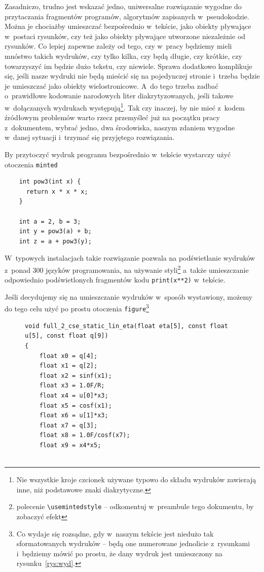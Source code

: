 {Zasadniczo, trudno jest wskazać jedno, uniwersalne rozwiązanie wygodne do przytaczania fragmentów programów, algorytmów zapisanych w~pseudokodzie. Mo\-żna je chociażby umieszczać bezpośrednio w~tekście, jako obiekty pływające w~postaci rysunków, czy też jako obiekty pływające utworzone niezależnie od rysunków. Co lepiej zapewne zależy od tego, czy w~pracy będziemy mieli mnóstwo takich wydruków, czy tylko kilka, czy będą długie, czy krótkie, czy towarzyszyć im będzie dużo tekstu, czy niewiele. Sprawa dodatkowo komplikuje się, jeśli nasze wydruki nie będą mieścić się na pojedynczej stronie i~trzeba będzie je umieszczać jako obiekty wielostronicowe. A~do tego trzeba zadbać o~prawidłowe kodowanie narodowych liter diakrytyzowanych, jeśli takowe w~dołączanych wydrukach występują\footnote{\red Nie wszystkie kroje czcionek używane typowo do składu wydruków zawierają inne, niż podstawowe znaki diakrytyczne.}. Tak czy inaczej, by nie mieć z~kodem źródłowym problemów warto rzecz przemyśleć już na początku pracy z~dokumentem, wybrać jedno, dwa środowiska, naszym zdaniem wygodne w~danej sytuacji i~trzymać się przyjętego rozwiązania.

By przytoczyć wydruk programu bezpośrednio w~tekście wystarczy użyć otoczenia \texttt{minted}
  \begin{verbatim}
    int pow3(int x) {
      return x * x * x;
    }

    int a = 2, b = 3;
    int y = pow3(a) + b;
    int z = a + pow3(y);
  \end{verbatim}
W~typowych instalacjach takie rozwiązanie pozwala na podświetlanie wydruków z~ponad 300 języków programowania, na używanie styli\footnote{\red polecenie \texttt{\textbackslash usemintedstyle} -- odkomentuj w~preambule tego dokumentu, by zobaczyć efekt} a~także umieszczanie odpowiednio podświetlonych fragmentów kodu \texttt{print(x**2)} w~tekście.

Jeśli decydujemy się na umieszczanie wydruków w~sposób wystawiony, możemy do tego celu użyć po prostu otoczenia \texttt{figure}\footnote{\red Co wydaje się rozsądne, gdy w~naszym tekście jest niedużo tak sformatowanych wydruków -- będą one numerowane jednolicie z~rysunkami i~będziemy mówić po prostu, że dany wydruk jest umieszczony na rysunku~\ref{rys:wyd}.}
\begin{figure}[tp]
    \begin{verbatim}
void full_2_cse_static_lin_eta(float eta[5], const float u[5], const float q[9])
{
    float x0 = q[4];
    float x1 = q[2];
    float x2 = sinf(x1);
    float x3 = 1.0F/R;
    float x4 = u[0]*x3;
    float x5 = cosf(x1);
    float x6 = u[1]*x3;
    float x7 = q[3];
    float x8 = 1.0F/cosf(x7);
    float x9 = x4*x5;


\end{verbatim}
\end{figure}}
